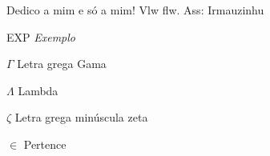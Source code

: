 \documentclass[12pt,
				openright,
				twoside,
				a4paper,
				apter=TITLE,
				section=TITLE,
				subsection=TITLE,
				chapter=TITLE,
				english,
				brazil]{abntex2}
\begin{document}

\begin{flushright}
\begin{minipage}[b]{13cm}
\vspace{20.01cm}

\calligra Dedico a mim e só a mim! Vlw flw. 
Ass: Irmauzinhu

\end{minipage}
\end{flushright}
\clearpage

\listoffigures*
\cleardoublepage

\listoftables*
\cleardoublepage

\begin{siglas}
\item EXP \textit{Exemplo} 

\end{siglas}

\begin{simbolos}
  \item[$ \Gamma $] Letra grega Gama
  \item[$ \Lambda $] Lambda
  \item[$ \zeta $] Letra grega minúscula zeta
  \item[$ \in $] Pertence
\end{simbolos}

\tableofcontents*
\cleardoublepage


\textual


\frenchspacing 

\end{document}
